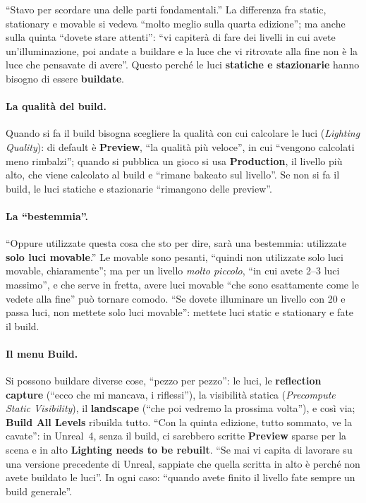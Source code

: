 ``Stavo per scordare una delle parti fondamentali.'' La differenza fra static, stationary e
movable si vedeva ``molto meglio sulla quarta edizione''; ma anche sulla quinta ``dovete
stare attenti'': ``vi capiterà di fare dei livelli in cui avete un'illuminazione, poi andate
a buildare e la luce che vi ritrovate alla fine non è la luce che pensavate di avere''.
Questo perché le luci \textbf{statiche e stazionarie} hanno bisogno di essere
\textbf{buildate}.

\paragraph{La qualità del build.} Quando si fa il build bisogna scegliere la qualità con cui
calcolare le luci (\emph{Lighting Quality}): di default è \textbf{Preview}, ``la qualità
più veloce'', in cui ``vengono calcolati meno rimbalzi''; quando si pubblica un gioco si usa
\textbf{Production}, il livello più alto, che viene calcolato al build e ``rimane bakeato
sul livello''. Se non si fa il build, le luci statiche e stazionarie ``rimangono delle
preview''.

\paragraph{La ``bestemmia''.} ``Oppure utilizzate questa cosa che sto per dire, sarà una
bestemmia: utilizzate \textbf{solo luci movable}.'' Le movable sono pesanti, ``quindi non
utilizzate solo luci movable, chiaramente''; ma per un livello \emph{molto piccolo}, ``in cui
avete 2--3 luci massimo'', e che serve in fretta, avere luci movable ``che sono esattamente
come le vedete alla fine'' può tornare comodo. ``Se dovete illuminare un livello con 20 e
passa luci, non mettete solo luci movable'': mettete luci static e stationary e fate il
build.

\paragraph{Il menu Build.} Si possono buildare diverse cose, ``pezzo per pezzo'': le luci,
le \textbf{reflection capture} (``ecco che mi mancava, i riflessi''), la visibilità statica
(\emph{Precompute Static Visibility}), il \textbf{landscape} (``che poi vedremo la prossima
volta''), e così via; \textbf{Build All Levels} ribuilda tutto. ``Con la quinta edizione,
tutto sommato, ve la cavate'': in Unreal~4, senza il build, ci sarebbero scritte
\textbf{Preview} sparse per la scena e in alto \textbf{Lighting needs to be rebuilt}.
``Se mai vi capita di lavorare su una versione precedente di Unreal, sappiate che quella
scritta in alto è perché non avete buildato le luci''. In ogni caso: ``quando avete finito
il livello fate sempre un build generale''.

